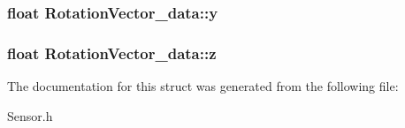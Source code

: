 \subsubsection[{y}]{\setlength{\rightskip}{0pt plus 5cm}float Rotation\-Vector\-\_\-data\-::y}\label{structRotationVector__data_a93edfbb694f4b2be1ba7817da2dd9ad4}
\subsubsection[{z}]{\setlength{\rightskip}{0pt plus 5cm}float Rotation\-Vector\-\_\-data\-::z}\label{structRotationVector__data_a7ef40176f6afe7cd85cea7c5e6da155a}


The documentation for this struct was generated from the following file\-:\begin{DoxyCompactItemize}
\item 
Sensor.\-h\end{DoxyCompactItemize}

